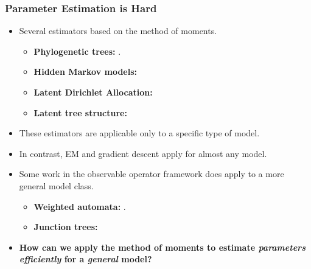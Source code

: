 \documentclass[xcolor={svgnames}]{beamer}
\begin{document}
\begin{frame}
  \frametitle{Parameter Estimation is Hard}

  \begin{itemize}
    \item<+-> Several estimators based on the method of moments.
      \begin{itemize}
        \item {\bf Phylogenetic trees:} \cite{mossel2005learning}.
        \item {\bf Hidden Markov models:} \cite{hsu09spectral}
        \item {\bf Latent Dirichlet Allocation:} \cite{anandkumar12lda}
        \item {\bf Latent tree structure:} \cite{anandkumar11tree, hsu12identifiability}
      \end{itemize}
    \item<+-> These estimators are applicable only to a specific type of
      model. 
    \item<+-> In contrast, EM and gradient descent apply for almost any model.
    \item<+-> Some work in the observable operator framework does apply to a more general model class.
      \begin{itemize}
        \item {\bf Weighted automata:} \cite{balle12automata}.
        \item {\bf Junction trees:} \cite{song2011spectral}
      \end{itemize}
    \item<+-> {\bf How can we apply the method of moments to estimate {\em parameters efficiently} for a {\em general} model?}
  \end{itemize}
\end{frame}
\end{document}
